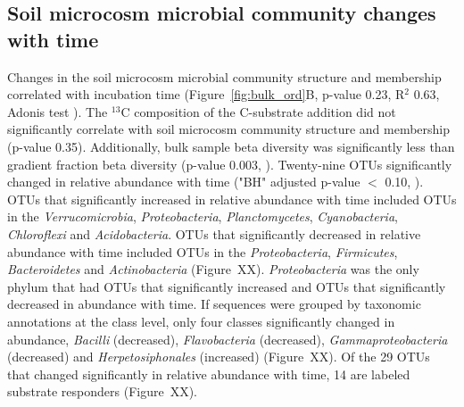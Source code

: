 \subsection{Soil microcosm microbial community changes with time}
Changes in the soil microcosm microbial community structure and membership
correlated with incubation time (Figure~\ref{fig:bulk_ord}B, p-value 0.23,
R$^{2}$ 0.63, Adonis test \citet{Anderson2001a}). The $^{13}$C composition
of the C-substrate addition did not significantly correlate with soil microcosm
community structure and membership (p-value 0.35). Additionally, bulk sample
beta diversity was significantly less than gradient fraction beta diversity
(p-value 0.003, \citet{Anderson2006}). Twenty-nine OTUs significantly changed
in relative abundance with time ("BH" adjusted p-value $<$ 0.10,
\citet{YBenjamini1995}).  OTUs that significantly increased in relative
abundance with time included OTUs in the \textit{Verrucomicrobia},
\textit{Proteobacteria}, \textit{Planctomycetes}, \textit{Cyanobacteria},
\textit{Chloroflexi} and \textit{Acidobacteria}. OTUs that significantly
decreased in relative abundance with time included OTUs in the
\textit{Proteobacteria}, \textit{Firmicutes}, \textit{Bacteroidetes} and
\textit{Actinobacteria} (Figure~XX).  \textit{Proteobacteria} was the only
phylum that had OTUs that significantly increased and OTUs that significantly
decreased in abundance with time. If sequences were grouped by taxonomic
annotations at the class level, only four classes significantly changed in
abundance, \textit{Bacilli} (decreased), \textit{Flavobacteria} (decreased),
\textit{Gammaproteobacteria} (decreased) and \textit{Herpetosiphonales}
(increased) (Figure~XX). Of the 29 OTUs that changed significantly in relative
abundance with time, 14 are labeled substrate responders (Figure~XX).

